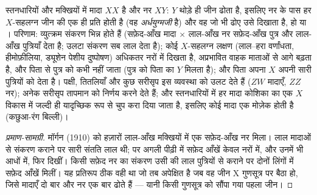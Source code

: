 \begin{proposition}[लिंग-सहलग्न वंशागति]\label{prop:b2:meiosis-heredity:sexlinked}
स्तनधारियों और मक्खियों में मादा $XX$ है और नर $XY$: $Y$ थोड़े ही जीन
ढोता है, इसलिए नर के पास हर $X$-सहलग्न जीन की एक ही प्रति होती है (वह
\emph{अर्धयुग्मजी} है) और वह जो भी  ढोए उसे दिखाता है,
 हो या । परिणाम: व्युत्क्रम संकरण भिन्न होते हैं
(सफ़ेद-आँख मादा $\times$ लाल-आँख नर सफ़ेद-आँख पुत्र और लाल-आँख पुत्रियाँ
देता है; उलटा संकरण सब लाल देता है); कोई 
$X$-सहलग्न लक्षण (लाल--हरा वर्णांधता, हीमोफ़ीलिया, ड्यूशेन
पेशीय दुष्पोषण) अधिकतर नरों में दिखता है, अप्रभावित वाहक माताओं से आगे
बढ़ता है, और पिता से पुत्र को कभी नहीं जाता (पुत्र को पिता का $Y$ मिलता
है); और पिता अपना $X$ अपनी सारी पुत्रियों को देता है।
पक्षी, तितलियाँ और कुछ सरीसृप इस व्यवस्था को उलट देते हैं ($ZW$
मादाएँ, $ZZ$ नर); अनेक सरीसृप तापमान को निर्णय करने देते हैं; और
स्तनधारियों में हर मादा कोशिका का एक $X$ विकास में जल्दी ही यादृच्छिक
रूप से चुप करा दिया जाता है, इसलिए कोई  मादा एक मोज़ेक होती
है (कछुआ-रंग बिल्ली)।
\end{proposition}
\begin{proof}[प्रमाण-सामग्री]
मॉर्गन (1910) को हज़ारों लाल-आँख मक्खियों में एक सफ़ेद-आँख नर मिला। लाल
मादाओं से संकरण कराने पर सारी संतति लाल थी; पर अगली पीढ़ी में सफ़ेद
आँखें केवल नरों में, और उनमें भी आधों में, फिर दिखीं। किसी सफ़ेद नर का
संकरण उसी की लाल पुत्रियों से कराने पर दोनों लिंगों में सफ़ेद आँखें
मिलीं। यह प्रतिरूप ठीक वही था जो तब अपेक्षित है जब वह जीन X गुणसूत्र पर
बैठा हो, जिसे मादाएँ दो बार और नर एक बार ढोते हैं --- यानी किसी
गुणसूत्र को सौंपा गया पहला जीन।
\end{proof}

